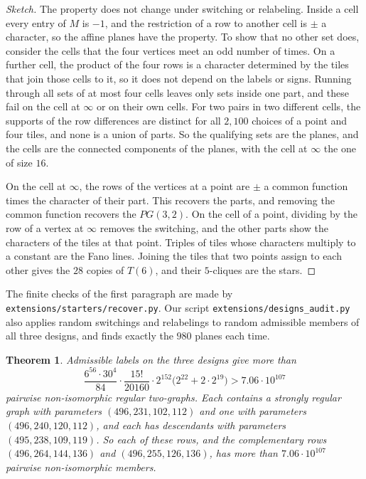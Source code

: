 \documentclass[11pt]{amsart}
\newtheorem{theorem}{Theorem}[section]
\theoremstyle{remark}
\begin{document}
\begin{proof}[Sketch]
The property does not change under switching or relabeling. Inside a cell every entry of $M$ is $-1$, and the restriction of a row to another cell is $\pm$ a character, so the affine planes have the property. To show that no other set does, consider the cells that the four vertices meet an odd number of times. On a further cell, the product of the four rows is a character determined by the tiles that join those cells to it, so it does not depend on the labels or signs. Running through all sets of at most four cells leaves only sets inside one part, and these fail on the cell at $\infty$ or on their own cells. For two pairs in two different cells, the supports of the row differences are distinct for all $2{,}100$ choices of a point and four tiles, and none is a union of parts. So the qualifying sets are the planes, and the cells are the connected components of the planes, with the cell at $\infty$ the one of size $16$.

On the cell at $\infty$, the rows of the vertices at a point are $\pm$ a common function times the character of their part. This recovers the parts, and removing the common function recovers the $PG(3,2)$. On the cell of a point, dividing by the row of a vertex at $\infty$ removes the switching, and the other parts show the characters of the tiles at that point. Triples of tiles whose characters multiply to a constant are the Fano lines. Joining the tiles that two points assign to each other gives the $28$ copies of $T(6)$, and their $5$-cliques are the stars.
\end{proof}

The finite checks of the first paragraph are made by \texttt{extensions/starters/recover.py}. Our script \texttt{extensions/designs\_audit.py} also applies random switchings and relabelings to random admissible members of all three designs, and finds exactly the $980$ planes each time.

\begin{theorem}\label{thm:count}
Admissible labels on the three designs give more than
\[
\frac{6^{56}\cdot30^{4}}{84}\cdot\frac{15!}{20160}\cdot2^{152}\bigl(2^{22}+2\cdot2^{19}\bigr)>7.06\cdot10^{107}
\]
pairwise non-isomorphic regular two-graphs. Each contains a strongly regular graph with parameters $(496,231,102,112)$ and one with parameters $(496,240,120,112)$, and each has descendants with parameters $(495,238,109,119)$. So each of these rows, and the complementary rows $(496,264,144,136)$ and $(496,255,126,136)$, has more than $7.06\cdot10^{107}$ pairwise non-isomorphic members.
\end{theorem}
\end{document}
